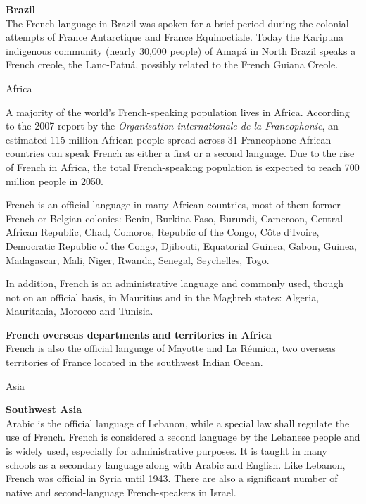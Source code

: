 \begin{multicols}{2}
{\bf Brazil}\\
The French language in Brazil was spoken for a brief period during the
colonial attempts of France Antarctique and France Equinoctiale. Today
the Karipuna indigenous community (nearly 30,000 people) of Amapá in
North Brazil speaks a French creole, the Lanc-Patuá, possibly related
to the French Guiana Creole.

\begin{center}
{\sc Africa}
\end{center}

A majority of the world's French-speaking population lives in
Africa. According to the 2007 report by the {\em Organisation
internationale de la Francophonie}, an estimated 115 million African
people spread across 31 Francophone African countries can speak French
as either a first or a second language. Due to the rise of French in
Africa, the total French-speaking population is expected to reach 700
million people in 2050.

French is an official language in many African countries, most of them
former French or Belgian colonies: Benin, Burkina Faso, Burundi,
Cameroon, Central African Republic, Chad, Comoros, Republic of the
Congo, Côte d'Ivoire, Democratic Republic of the Congo, Djibouti,
Equatorial Guinea, Gabon, Guinea, Madagascar, Mali, Niger, Rwanda,
Senegal, Seychelles, Togo.

In addition, French is an administrative language and commonly used,
though not on an official basis, in Mauritius and in the Maghreb
states: Algeria, Mauritania, Morocco and Tunisia.

{\bf French overseas departments and territories in Africa}\\
French is also the official language of Mayotte and La Réunion, two
overseas territories of France located in the southwest Indian Ocean.

\vspace{1cm}
\begin{center}
{\sc Asia}
\end{center}

{\bf Southwest Asia}\\ 
Arabic is the official language of Lebanon, while a special law shall
regulate the use of French. French is considered a second language by
the Lebanese people and is widely used, especially for administrative
purposes. It is taught in many schools as a secondary language along
with Arabic and English. Like Lebanon, French was official in Syria
until 1943. There are also a significant number of native and
second-language French-speakers in Israel.


\end{multicols}
